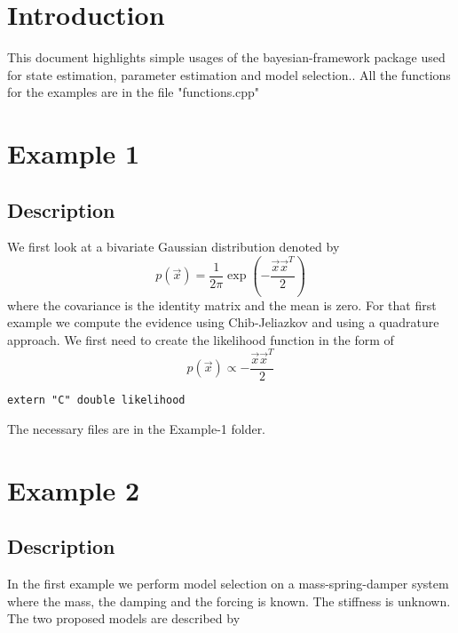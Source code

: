 \documentclass{article}
\begin{document}
\the\textwidth

\section{Introduction}

This document highlights simple usages of the bayesian-framework package used for state estimation, parameter estimation and model selection.. All the functions for the examples are in the file "functions.cpp"

\section{Example 1}

\subsection{Description}
We first look at a bivariate Gaussian distribution denoted by 
\begin{equation}
p(\vec{x}) = \frac{1}{2 \pi } \exp\left( -\frac{\vec{x} \vec{x}^T}{2} \right)
\end{equation}
where the covariance is the identity matrix and the mean is zero. For that first example we compute the evidence using Chib-Jeliazkov and using a quadrature approach. We first need to create the likelihood function in the form of
\begin{equation}
p(\vec{x}) \propto -\frac{\vec{x} \vec{x}^T}{2}
\end{equation}

\begin{lstlisting}
extern "C" double likelihood 
\end{lstlisting}

The necessary files are in the Example-1 folder.


\section{Example 2}

\subsection{Description}
In the first example we perform model selection on a mass-spring-damper system where the mass, the damping and the forcing is known. The stiffness is unknown. The two proposed models are described by 
\end{document}
